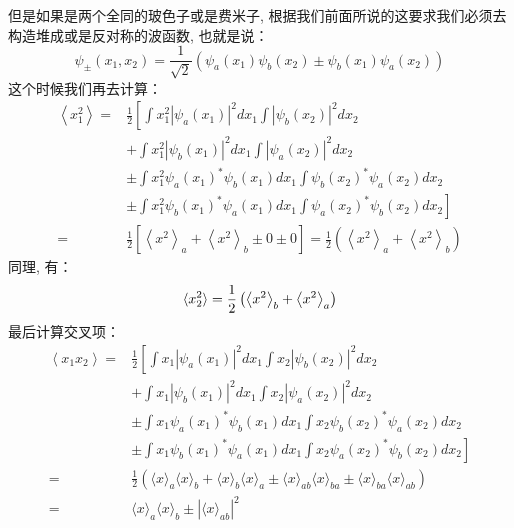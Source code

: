\documentclass[a4paper,zihao=-4,linespread=1]{ctexrep}
\begin{document}
    但是如果是两个全同的玻色子或是费米子, 根据我们前面所说的这要求我们必须去构造堆成或是反对称的波函数, 也就是说：
    \[\psi_\pm(x_1,x_2)=\frac{1}{\sqrt{2}}\left(\psi_a(x_1)\psi_b(x_2)\pm\psi_b(x_1)\psi_a(x_2)\right)\]
    这个时候我们再去计算：
    \begin{equation}
       \begin{aligned}
            \left\langle x_{1}^{2}\right\rangle=& \frac{1}{2}\left[\int x_{1}^{2}\left|\psi_{a}\left(x_{1}\right)\right|^{2} d x_{1} \int\left|\psi_{b}\left(x_{2}\right)\right|^{2} d x_{2}\right.\\
            &\left.+\int x_{1}^{2}\left|\psi_{b}\left(x_{1}\right)\right|^{2} d x_{1} \int\left|\psi_{a}\left(x_{2}\right)\right|^{2} d x_{2} \right.\\
            &\left.\pm \int x_{1}^{2} \psi_{a}\left(x_{1}\right)^{*} \psi_{b}\left(x_{1}\right) d x_{1} \int \psi_{b}\left(x_{2}\right)^{*} \psi_{a}\left(x_{2}\right) d x_{2}\right. \\
            &\left.\pm \int x_{1}^{2} \psi_{b}\left(x_{1}\right)^{*} \psi_{a}\left(x_{1}\right) d x_{1} \int \psi_{a}\left(x_{2}\right)^{*} \psi_{b}\left(x_{2}\right) d x_{2}\right] \\
            =& \frac{1}{2}\left[\left\langle x^{2}\right\rangle_{a}+\left\langle x^{2}\right\rangle_{b} \pm 0 \pm 0\right]=\frac{1}{2}\left(\left\langle x^{2}\right\rangle_{a}+\left\langle x^{2}\right\rangle_{b}\right)
        \end{aligned} 
    \end{equation}
    同理, 有：
    \begin{equation}
        \braket{x_2^2}=\frac{1}{2}\left(\left\langle x^{2}\right\rangle_{b}+\left\langle x^{2}\right\rangle_{a}\right)
    \end{equation}
    最后计算交叉项：
    \begin{equation}
        \begin{aligned}
            \left\langle x_{1} x_{2}\right\rangle=& \frac{1}{2}\left[\int x_{1}\left|\psi_{a}\left(x_{1}\right)\right|^{2} d x_{1} \int x_{2}\left|\psi_{b}\left(x_{2}\right)\right|^{2} d x_{2}\right.\\
            &\left.+\int x_{1}\left|\psi_{b}\left(x_{1}\right)\right|^{2} d x_{1} \int x_{2}\left|\psi_{a}\left(x_{2}\right)\right|^{2} d x_{2}\right. \\
            &\left. \pm \int x_{1} \psi_{a}\left(x_{1}\right)^{*} \psi_{b}\left(x_{1}\right) d x_{1} \int x_{2} \psi_{b}\left(x_{2}\right)^{*} \psi_{a}\left(x_{2}\right) d x_{2}\right. \\
            &\left.\pm \int x_{1} \psi_{b}\left(x_{1}\right)^{*} \psi_{a}\left(x_{1}\right) d x_{1} \int x_{2} \psi_{a}\left(x_{2}\right)^{*} \psi_{b}\left(x_{2}\right) d x_{2}\right] \\
            =& \frac{1}{2}\left(\langle x\rangle_{a}\langle x\rangle_{b}+\langle x\rangle_{b}\langle x\rangle_{a} \pm\langle x\rangle_{a b}\langle x\rangle_{b a} \pm\langle x\rangle_{b a}\langle x\rangle_{a b}\right) \\
            =&\langle x\rangle_{a}\langle x\rangle_{b} \pm\left|\langle x\rangle_{a b}\right|^{2}
        \end{aligned}
    \end{equation}
\end{document}
